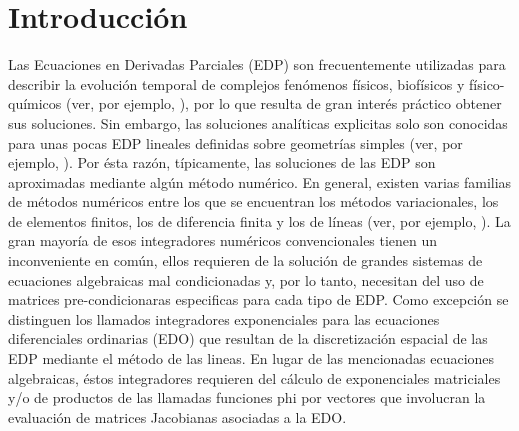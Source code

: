 \chapter*{Introducción}\label{chapter:introduction}

Las Ecuaciones en Derivadas Parciales (EDP) son frecuentemente utilizadas para describir la evolución temporal de complejos fenómenos físicos, biofísicos y físico-químicos (ver, por ejemplo, \cite{tikhonov2013,gray1990,cronin1987}), por lo que resulta de gran interés práctico obtener sus soluciones. Sin embargo, las soluciones analíticas explicitas solo son conocidas para unas pocas EDP lineales definidas sobre geometrías simples (ver, por ejemplo, \cite{tikhonov2013}). Por ésta razón, típicamente, las soluciones de las EDP son aproximadas mediante algún método numérico. En general, existen varias familias de métodos numéricos entre los que se encuentran los métodos variacionales, los de elementos finitos, los de diferencia finita y los de líneas (ver, por ejemplo, \cite{prenter2008,samarskii2008,schiesser2012}). La gran mayoría de esos integradores numéricos convencionales tienen un inconveniente en común, ellos requieren de la solución de grandes sistemas de ecuaciones algebraicas mal condicionadas y, por lo tanto, necesitan del uso de matrices pre-condicionaras especificas para cada tipo de EDP. Como excepción se distinguen los llamados integradores exponenciales para las ecuaciones diferenciales ordinarias (EDO) que resultan de la discretización espacial de las EDP mediante el método de las lineas. En lugar de las mencionadas ecuaciones algebraicas, éstos integradores requieren del cálculo de exponenciales matriciales y/o de productos de las llamadas funciones phi por vectores que involucran la evaluación de matrices Jacobianas asociadas a la EDO.

%

